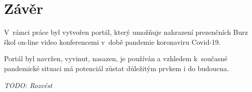 \chapter*{Závěr}

V~rámci práce byl vytvořen portál, který umožňuje nahrazení prezenčních Burz škol on-line video konferencemi v~době pandemie koronaviru Covid-19.

Portál byl navržen, vyvinut, nasazen, je používán a vzhledem k~současné pandemické situaci má potenciál zůstat důležitým prvkem i do budoucna.

\emph{TODO: Rozvést}

% 
% 
% 
% 

\pagebreak